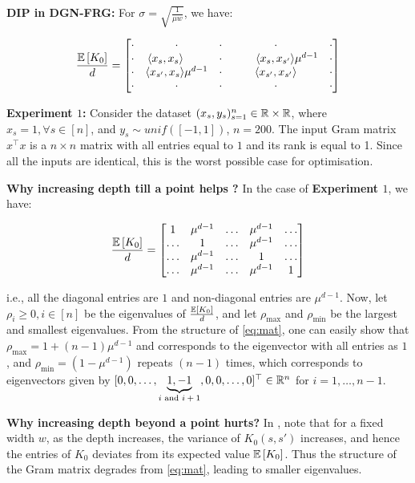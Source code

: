 \textbf{DIP in DGN-FRG:} For $\sigma=\sqrt{\frac{1}{\mu w}}$, we have:

\begin{align*}
\frac{\mathbb{E}\left[K_0\right]}{d}=\left[\begin{matrix}
\cdot&\cdot &\cdot &\cdot &\cdot \\ 
\cdot&\langle x_s,x_s\rangle\quad\quad &\cdot &\quad\quad\langle x_s,x_{s'}\rangle\mu^{d-1} &\cdot\\ 
\cdot&\langle x_{s'},x_s\rangle\mu^{d-1} &\cdot &\langle x_{s'},x_{s'}\rangle &\cdot \\
\cdot&\cdot &\cdot &\cdot &\cdot  
\end{matrix}\right]
\end{align*}


\textbf{Experiment $1$:} Consider the dataset $(x_s,y_s)_{s=1}^n\in \mathbb{R}\times \mathbb{R}$, where $x_s=1,\forall s\in [n]$, and $y_s\sim unif([-1,1])$, $n=200$. The input Gram matrix $x^\top x$ is a $n\times n$ matrix with all entries equal to $1$ and its rank is equal to 1. Since all the inputs are identical, this is the worst possible case for optimisation.


\textbf{Why increasing depth till a point helps ?} 
In the case of \textbf{Experiment $1$}, we have:

\begin{align}\label{eq:mat}
\frac{\mathbb{E}\left[K_0\right]}{d}=\left[\begin{matrix}
1 &\mu^{d-1} &\ldots &\mu^{d-1} &\ldots\\ 
\ldots &1 &\ldots &\mu^{d-1} &\ldots\\ 
\ldots &\mu^{d-1} &\ldots &1 &\ldots \\
\ldots &\mu^{d-1} &\ldots &\mu^{d-1} &1\\ 
\end{matrix}\right]
\end{align}

i.e., all the diagonal entries are $1$ and non-diagonal entries are $\mu^{d-1}$. Now, let $\rho_i\geq 0,i \in [n]$ be the eigenvalues of $\frac{\mathbb{E}\left[K_0\right]}{d}$, and let $\rho_{\max}$ and $\rho_{\min}$ be the largest and smallest eigenvalues. From the structure of \eqref{eq:mat}, one can easily show that $\rho_{\max}=1+(n-1)\mu^{d-1}$ and corresponds to the eigenvector with all entries as $1$, and $\rho_{\min}=(1-\mu^{d-1})$ repeats $(n-1)$ times, which corresponds to eigenvectors given by $[0, 0, \ldots, \underbrace{1, -1}_{\text{$i$ and $i+1$}}, 0,0,\ldots, 0]^\top \in \mathbb{R}^n$ for $i=1,\ldots,n-1$.



\textbf{Why increasing depth beyond a point hurts?} 
In , note that for a fixed width $w$, as the depth increases, the variance of $K_0(s,s')$ increases, and hence the entries of $K_0$ deviates from its expected value $\mathbb{E}\left[K_0\right]$. Thus the structure of the Gram matrix degrades from \eqref{eq:mat}, leading to smaller eigenvalues.

